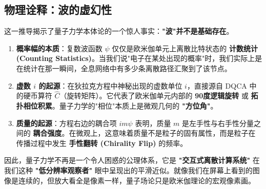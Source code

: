 \subsection{物理诠释：波的虚幻性}

这一推导揭示了量子力学本体论的一个惊人事实：\textbf{"波"并不是基础存在}。

\begin{enumerate}
\item \textbf{概率幅的本质}：复数波函数 $\psi$ 仅仅是欧米伽单元上离散比特状态的 \textbf{计数统计 (Counting Statistics)}。当我们说"电子在某处出现的概率"时，我们实际上是在统计在那一瞬间，全息网络中有多少条离散路径汇聚到了该节点。
\item \textbf{虚数 $i$ 的起源}：在狄拉克方程中神秘出现的虚数单位 $i$，直接源自 DQCA 中的硬币算符 $\hat{C}$（旋转矩阵）。它代表了欧米伽单元内部的 \textbf{90度逻辑旋转} 或 \textbf{拓扑相位积累}。量子力学的"相位"本质上是微观几何的 \textbf{"方位角"}。
\item \textbf{质量的起源}：方程右边的耦合项 $im\psi$ 表明，质量 $m$ 是左手性与右手性分量之间的 \textbf{耦合强度}。在微观上，这意味着质量不是粒子的固有属性，而是粒子在传播过程中发生 \textbf{手性翻转 (Chirality Flip)} 的频率。
\end{enumerate}

因此，量子力学不再是一个令人困惑的公理体系，它是 \textbf{"交互式离散计算系统"} 在我们这种 \textbf{"低分辨率观察者"} 眼中呈现出的平滑近似。就像我们在屏幕上看到的图像是连续的，但放大看全是像素一样，量子场论只是欧米伽理论的宏观像素画。

